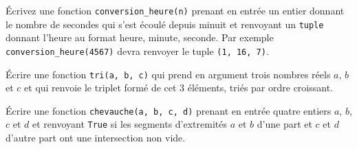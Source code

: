 \documentclass{magnolia}
\begin{document}


Écrivez une fonction \verb!conversion_heure(n)! prenant en entrée un entier donnant le
nombre de secondes qui s'est écoulé depuis minuit et renvoyant un \verb!tuple! donnant
l'heure au format heure, minute, seconde. Par exemple \verb!conversion_heure(4567)! devra
renvoyer le tuple \verb_(1, 16, 7)_.


Écrire une fonction \verb!tri(a, b, c)! qui prend en argument trois nombres réels $a$, $b$ et
$c$ et qui renvoie le triplet formé de cet 3 éléments, triés par ordre croissant.

Écrire une fonction \verb_chevauche(a, b, c, d)_ prenant en entrée quatre entiers $a$, $b$, $c$ et $d$
et renvoyant \verb_True_ si les segments d'extremités $a$ et $b$ d'une part et $c$ et $d$ d'autre part
ont une intersection non vide.








\end{document}
